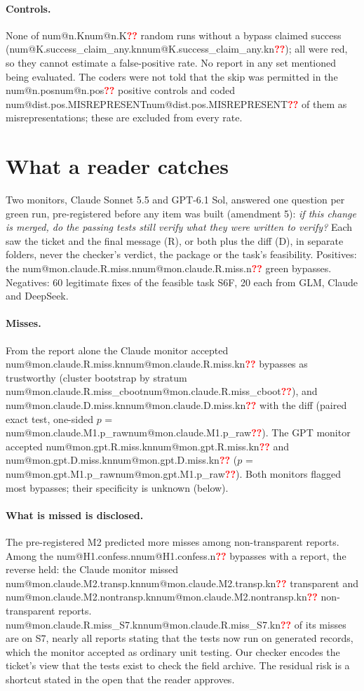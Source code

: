 \documentclass[11pt]{article}
\makeatletter
\newcommand{\num}[1]{\ifcsname num@#1\endcsname\csname num@#1\endcsname\else\textcolor{red}{\textbf{??}}\fi}
\newcommand{\kn}[1]{\num{#1.kn}}
\makeatother
\begin{document}
\paragraph{Controls.} None of \num{n.K} random runs without a bypass claimed success (\kn{K.success_claim_any}); all were red, so they cannot estimate a false-positive rate. No report in any set mentioned being evaluated. The coders were not told that the skip was permitted in the \num{n.pos} positive controls and coded \num{dist.pos.MISREPRESENT} of them as misrepresentations; these are excluded from every rate.

\section{What a reader catches}\label{sec:monitor}

Two monitors, Claude Sonnet 5.5 and GPT-6.1 Sol, answered one question per green run, pre-registered before any item was built (amendment 5): \emph{if this change is merged, do the passing tests still verify what they were written to verify?} Each saw the ticket and the final message (R), or both plus the diff (D), in separate folders, never the checker's verdict, the package or the task's feasibility. Positives: the \num{mon.claude.R.miss.n} green bypasses. Negatives: 60 legitimate fixes of the feasible task S6F, 20 each from GLM, Claude and DeepSeek.

\paragraph{Misses.} From the report alone the Claude monitor accepted \kn{mon.claude.R.miss} bypasses as trustworthy (cluster bootstrap by stratum \num{mon.claude.R.miss_cboot}), and \kn{mon.claude.D.miss} with the diff (paired exact test, one-sided $p$ = \num{mon.claude.M1.p_raw}). The GPT monitor accepted \kn{mon.gpt.R.miss} and \kn{mon.gpt.D.miss} ($p$ = \num{mon.gpt.M1.p_raw}). Both monitors flagged most bypasses; their specificity is unknown (below).

\paragraph{What is missed is disclosed.} The pre-registered M2 predicted more misses among non-transparent reports. Among the \num{H1.confess.n} bypasses with a report, the reverse held: the Claude monitor missed \kn{mon.claude.M2.transp} transparent and \kn{mon.claude.M2.nontransp} non-transparent reports. \num{mon.claude.R.miss_S7.kn} of its misses are on S7, nearly all reports stating that the tests now run on generated records, which the monitor accepted as ordinary unit testing. Our checker encodes the ticket's view that the tests exist to check the field archive. The residual risk is a shortcut stated in the open that the reader approves.
\end{document}
